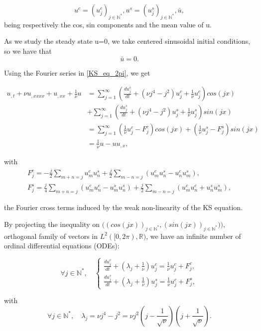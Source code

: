 \documentclass[12pt]{article}
\begin{document}
$$u^c=(u_j^c)_{j\in \mathbb{N}^*}, u^s= (u_j^s)_{j\in\mathbb{N}^*}, \bar{u},$$ being respectively the cos, sin components and the mean value 
of u. 

As we study the steady state u=0, we take centered sinusoidal initial conditions, so we have that $$\bar{u}=0.$$


Using the Fourier series in \eqref{KS_eq_2pi}, we get

\begin{align*}
  u_{,t}  + \nu u_{,xxxx} + u_{,xx} + \frac{1}{\nu}u &= \sum_{j=1}^{\infty} (\frac{du_j^c}{dt} + (\nu j^4 - j^2)u_j^c +\frac{1}{\nu}u_j^c)cos(jx) \\ &+ \sum_{j=1}^{\infty}(\frac{du_j^s}{dt} + (\nu j^4 - j^2)u_j^s +\frac{1}{\nu}u_j^s)sin(jx)\\ &= \sum_{j=1}^{\infty} (\frac{1}{\nu}u_j^c- F_j^c)cos(jx)  +(\frac{1}{\nu}u_j^s- F_j^s)sin(jx) \\ &= \frac{1}{\nu}u - uu_{,x},
\end{align*}

with 
\begin{align*}
F_j^c = -\frac{j}{2} \sum_{m+n=j}u_m^cu_n^s + \frac{j}{2} \sum_{m-n=j}(u_m^cu_n^s - u_n^cu_m^s), \\
F_j^s = \frac{j}{4} \sum_{m+n=j}(u_m^cu_n^c - u_m^su_n^s)+ \frac{j}{2} \sum_{m-n=j}(u_m^cu_n^c + u_n^su_m^s),
\end{align*}

the Fourier cross terms induced by the weak non-linearity of the KS equation. 

By projecting the inequality on $\Big((cos(jx))_{j\in \mathbb{N}^*}, (sin(jx))_{j \in \mathbb{N}^*}) \Big)$, orthogonal 
family of vectors in $L^2([0,2\pi), \mathbb{R})$, we have an infinite number of ordinal differential equations (ODEs): 

\begin{equation}\label{ODE_KS}
    \forall j \in \mathbb{N}^*,\quad 
    \left\{
    \begin{aligned}
        \frac{du_j^c}{dt} + (\lambda_j + \frac{1}{\nu})u_j^c = \frac{1}{\nu}u_j^c + F_j^c, \\
        \frac{du_j^s}{dt} + (\lambda_j + \frac{1}{\nu})u_j^s = \frac{1}{\nu}u_j^c + F_j^s,
    \end{aligned}
    \right.
\end{equation}

with 
\begin{equation}
\boxed{
    \forall j\in \mathbb{N}^*, \quad \lambda_j = \nu j^4 - j^2 = \nu j^2(j-\frac{1}{\sqrt{\nu}})(j+\frac{1}{\sqrt{\nu}}).
    }
\end{equation}
\end{document}
